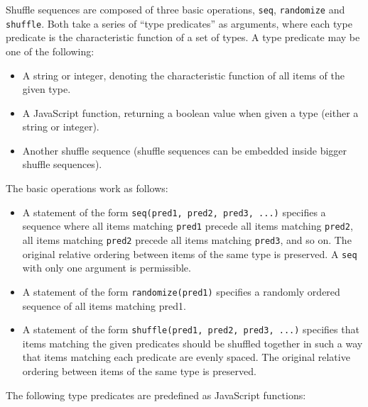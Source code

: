 \documentclass[11pt,letterpaper]{article}
\begin{document}
Shuffle sequences are composed of three basic operations, \texttt{seq}, \texttt{randomize}
and \texttt{shuffle}. Both take a series of ``type predicates'' as arguments, where each
type predicate is the characteristic function of a set of types. A type
predicate may be one of the following:

\begin{itemize}

\item
 A string or integer, denoting the characteristic function of all items of the given type.
\item
 A JavaScript function, returning a boolean value when given a type (either a string or integer).
\item
 Another shuffle sequence (shuffle sequences can be embedded inside bigger shuffle sequences).
\end{itemize}
The basic operations work as follows:

\begin{itemize}

\item
 A statement of the form \texttt{seq(pred1, pred2, pred3, ...)} specifies a sequence where all items matching \texttt{pred1} precede all items matching \texttt{pred2}, all items matching \texttt{pred2} precede all items matching \texttt{pred3}, and so on. The original relative ordering between items of the same type is preserved. A \texttt{seq} with only one argument is permissible.
\item
 A statement of the form \texttt{randomize(pred1)} specifies a randomly ordered sequence of all items matching pred1.
\item
 A statement of the form \texttt{shuffle(pred1, pred2, pred3, ...)} specifies that items matching the given predicates should be shuffled together in such a way that items matching each predicate are evenly spaced. The original relative ordering between items of the same type is preserved.
\end{itemize}
The following type predicates are predefined as JavaScript functions:
\end{document}
